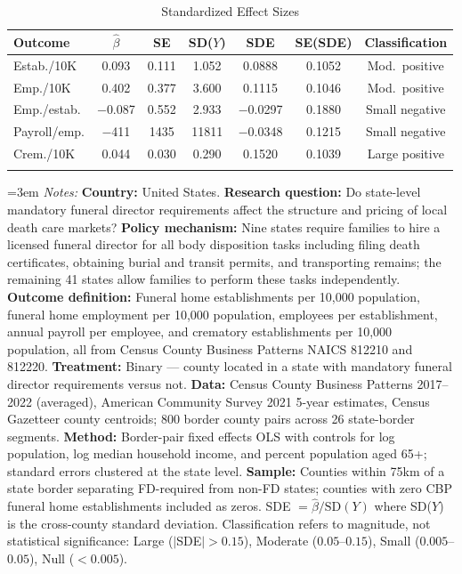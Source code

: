 \begin{table}[t]
\centering
\caption{Standardized Effect Sizes}
\label{tab:sde}
\footnotesize
\begin{tabular*}{\textwidth}{@{\extracolsep{\fill}}lcccccc}
\hline\hline
 Outcome & $\hat{\beta}$ & SE & SD($Y$) & SDE & SE(SDE) & Classification \\
\hline
\addlinespace
  Estab./10K & 0.093 & 0.111 & 1.052 & 0.0888 & 0.1052 & Mod.\ positive \\
  Emp./10K & 0.402 & 0.377 & 3.600 & 0.1115 & 0.1046 & Mod.\ positive \\
  Emp./estab. & $-$0.087 & 0.552 & 2.933 & $-$0.0297 & 0.1880 & Small negative \\
  Payroll/emp. & $-$411 & 1435 & 11811 & $-$0.0348 & 0.1215 & Small negative \\
  Crem./10K & 0.044 & 0.030 & 0.290 & 0.1520 & 0.1039 & Large positive \\
\addlinespace
\hline\hline
\end{tabular*}
\vspace{0.5em}
\parbox{0.95\textwidth}{\footnotesize\emergencystretch=3em\sloppy
\textit{Notes:} \textbf{Country:} United States.
\textbf{Research question:} Do state-level mandatory funeral director requirements affect the structure and pricing of local death care markets?
\textbf{Policy mechanism:} Nine states require families to hire a licensed funeral director for all body disposition tasks including filing death certificates, obtaining burial and transit permits, and transporting remains; the remaining 41 states allow families to perform these tasks independently.
\textbf{Outcome definition:} Funeral home establishments per 10,000 population, funeral home employment per 10,000 population, employees per establishment, annual payroll per employee, and crematory establishments per 10,000 population, all from Census County Business Patterns NAICS 812210 and 812220.
\textbf{Treatment:} Binary --- county located in a state with mandatory funeral director requirements versus not.
\textbf{Data:} Census County Business Patterns 2017--2022 (averaged), American Community Survey 2021 5-year estimates, Census Gazetteer county centroids; 800 border county pairs across 26 state-border segments.
\textbf{Method:} Border-pair fixed effects OLS with controls for log population, log median household income, and percent population aged 65+; standard errors clustered at the state level.
\textbf{Sample:} Counties within 75km of a state border separating FD-required from non-FD states; counties with zero CBP funeral home establishments included as zeros.
SDE $= \hat{\beta} / \text{SD}(Y)$ where SD($Y$) is the cross-county standard deviation. Classification refers to magnitude, not statistical significance: Large ($|$SDE$| > 0.15$), Moderate ($0.05$--$0.15$), Small ($0.005$--$0.05$), Null ($< 0.005$).
}
\end{table}

